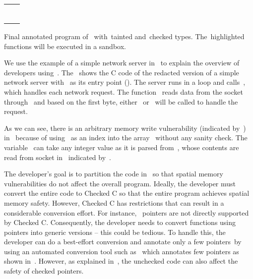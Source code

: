 \begin{listing}[t!]
  \begin{tabular}{c c}
    \begin{minipage}[b]{.22\textwidth}
\inputminted[mathescape, escapeinside=||, fontsize=\tiny{}]{c}{examples/conv1.c}
    \end{minipage} &
    \begin{minipage}[b]{.22\textwidth}
\inputminted[mathescape, highlightlines={1-19}, highlightcolor=taintcolor, escapeinside=||, fontsize=\tiny{}]{c}{examples/conv2.c}
    \end{minipage} %
  \end{tabular}
\caption{Final annotated program of~ with~\textcolor{taintcolor}{tainted} and~\textcolor{checkcolor}{checked} types. The~\colorbox{taintcolor}{highlighted} functions will be executed in a sandbox.}
\label{lst:final}
\end{listing}



We use the example of a simple network server in~ to explain the overview of developers using~\systemname{}.
The~ shows the C code of the redacted version of a simple network server with~ as its entry point (\entrypoint).
The server runs in a loop and calls~, which handles each network request.
The function~ reads data from the socket through~ and based on the first byte, either~ or~ will be called to handle the request.

As we can see, there is an arbitrary memory write vulnerability (indicated by~\realbug) in~ because of using~ as an index into the array~ without any sanity check.
The variable~ can take any integer value as it is parsed from~, whose contents are read from socket in~ indicated by~\rootcause.


The developer's goal is to partition the code in~ so that spatial memory vulnerabilities do not affect the overall program.
Ideally, the developer must convert the entire code to Checked C so that the entire program achieves spatial memory safety.
However, Checked C has restrictions that can result in a considerable conversion effort.
For instance,~ pointers are not directly supported by Checked C.
Consequently, the developer needs to convert functions using~ pointers into generic versions -- this could be tedious.
To handle this, the developer can do a best-effort conversion and annotate only a few pointers~\eg by using an automated conversion tool such as~\threec{} which annotates few pointers as shown in~.
However, as explained in~, the unchecked code can also affect the safety of checked pointers.

